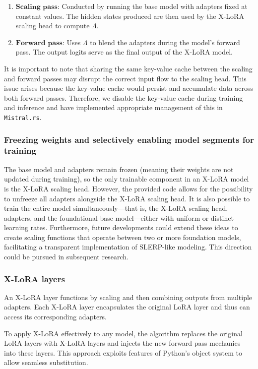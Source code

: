 \begin{enumerate}
    \item $\mathbf{Scaling}$ $\mathbf{pass}$: Conducted by running the base model with adapters fixed at constant values. The hidden states produced are then used by the X-LoRA scaling head to compute $\Lambda$.
    \item $\mathbf{Forward}$ $\mathbf{pass}$: Uses $\Lambda$ to blend the adapters during the model's forward pass. The output logits serve as the final output of the X-LoRA model.
\end{enumerate}

It is important to note that sharing the same key-value cache between the scaling and forward passes may disrupt the correct input flow to the scaling head. This issue arises because the key-value cache would persist and accumulate data across both forward passes. Therefore, we disable the key-value cache during training and inference and have implemented appropriate management of this in \texttt{Mistral.rs}.

\subsubsection{Freezing weights and selectively enabling model segments for training} The base model and adapters remain frozen (meaning their weights are not updated during training), so the only trainable component in an X-LoRA model is the X-LoRA scaling head. However, the provided code allows for the possibility to unfreeze all adapters alongside the X-LoRA scaling head. It is also possible to train the entire model simultaneously—that is, the X-LoRA scaling head, adapters, and the foundational base model—either with uniform or distinct learning rates. Furthermore, future developments could extend these ideas to create scaling functions that operate between two or more foundation models, facilitating a transparent implementation of SLERP-like modeling. This direction could be pursued in subsequent research.

\subsubsection{X-LoRA layers} An X-LoRA layer functions by scaling and then combining outputs from multiple adapters. Each X-LoRA layer encapsulates the original LoRA layer and thus can access its corresponding adapters.

To apply X-LoRA effectively to any model, the algorithm replaces the original LoRA layers with X-LoRA layers and injects the new forward pass mechanics into these layers. This approach exploits features of Python's object system to allow seamless substitution.

